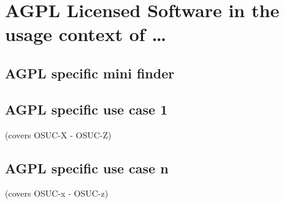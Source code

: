 %
%
%
%
%



\section{AGPL Licensed Software in the usage context of \ldots}
\label{OSUC-01-AGPL} \label{OSUC-03-AGPL} 
\label{OSUC-06-AGPL} \label{OSUC-09-AGPL}

\label{OSUC-02-AGPL} \label{OSUC-04-AGPL} \label{OSUC-05-AGPL}
\label{OSUC-07-AGPL} \label{OSUC-08-AGPL} \label{OSUC-10-AGPL}

\subsection{AGPL specific mini finder}

\subsection{AGPL specific use case 1}
(covers OSUC-X - OSUC-Z)

\subsection{AGPL specific use case n}
(covers OSUC-x - OSUC-z)


%
